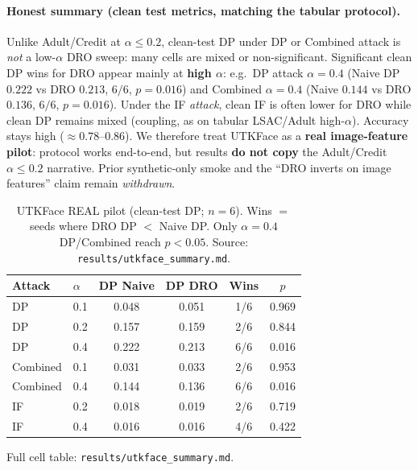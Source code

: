 \paragraph{Honest summary (clean test metrics, matching the tabular protocol).}
Unlike Adult/Credit at $\alpha\le0.2$, clean-test DP under DP or Combined
attack is \emph{not} a low-$\alpha$ DRO sweep: many cells are mixed or
non-significant.  Significant clean DP wins for DRO appear mainly at
\textbf{high $\alpha$}: e.g.\ DP attack $\alpha{=}0.4$ (Naive DP $0.222$ vs
DRO $0.213$, $6/6$, $p{=}0.016$) and Combined $\alpha{=}0.4$ (Naive $0.144$
vs DRO $0.136$, $6/6$, $p{=}0.016$).  Under the IF \emph{attack}, clean IF
is often lower for DRO while clean DP remains mixed (coupling, as on tabular
LSAC/Adult high-$\alpha$).  Accuracy stays high ($\approx0.78$--$0.86$).
We therefore treat UTKFace as a \textbf{real image-feature pilot}: protocol
works end-to-end, but results \textbf{do not copy} the Adult/Credit
$\alpha\le0.2$ narrative.  Prior synthetic-only smoke and the ``DRO inverts
on image features'' claim remain \emph{withdrawn}.

\begin{table}[h]
\centering\small
\caption{UTKFace REAL pilot (clean-test DP; $n{=}6$).  Wins $=$ seeds where
DRO DP $<$ Naive DP.  Only $\alpha{=}0.4$ DP/Combined reach $p{<}0.05$.
Source: \texttt{results/utkface\_summary.md}.}
\label{tab:utkface-pilot}
\begin{tabular}{llcccc}
\toprule
Attack & $\alpha$ & DP Naive & DP DRO & Wins & $p$ \\
\midrule
DP & 0.1 & 0.048 & 0.051 & 1/6 & 0.969 \\
DP & 0.2 & 0.157 & 0.159 & 2/6 & 0.844 \\
DP & 0.4 & 0.222 & 0.213 & 6/6 & 0.016 \\
Combined & 0.1 & 0.031 & 0.033 & 2/6 & 0.953 \\
Combined & 0.4 & 0.144 & 0.136 & 6/6 & 0.016 \\
IF & 0.2 & 0.018 & 0.019 & 2/6 & 0.719 \\
IF & 0.4 & 0.016 & 0.016 & 4/6 & 0.422 \\
\bottomrule
\end{tabular}
\end{table}

Full cell table: \texttt{results/utkface\_summary.md}.
